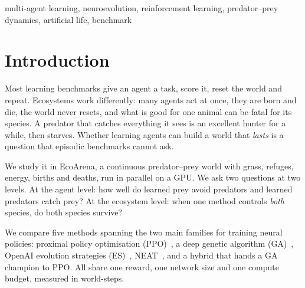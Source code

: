 \documentclass[conference]{IEEEtran}
\begin{document}
\begin{IEEEkeywords}
multi-agent learning, neuroevolution, reinforcement learning, predator--prey dynamics, artificial life, benchmark
\end{IEEEkeywords}

\section{Introduction}

Most learning benchmarks give an agent a task, score it, reset the world and repeat. Ecosystems work differently: many agents act at once, they are born and die, the world never resets, and what is good for one animal can be fatal for its species. A predator that catches everything it sees is an excellent hunter for a while, then starves. Whether learning agents can build a world that \emph{lasts} is a question that episodic benchmarks cannot ask.

We study it in EcoArena, a continuous predator--prey world with grass, refuges, energy, births and deaths, run in parallel on a GPU. We ask two questions at two levels. At the agent level: how well do learned prey avoid predators and learned predators catch prey? At the ecosystem level: when one method controls \emph{both} species, do both species survive?

We compare five methods spanning the two main families for training neural policies: proximal policy optimisation (PPO)~\cite{schulman2017ppo}, a deep genetic algorithm (GA)~\cite{such2017}, OpenAI evolution strategies (ES)~\cite{salimans2017}, NEAT~\cite{stanley2002}, and a hybrid that hands a GA champion to PPO. All share one reward, one network size and one compute budget, measured in world-steps.
\end{document}
